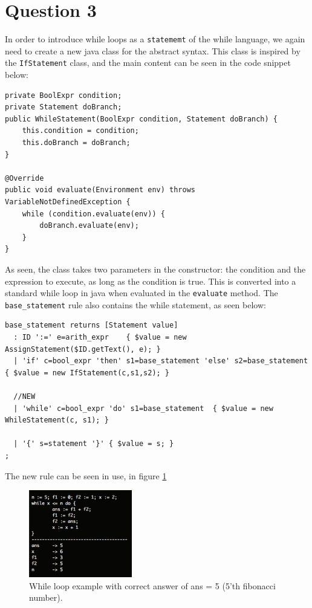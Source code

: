 \section*{Question 3}
In order to introduce while loops as a \texttt{statememt} of the while language, we again need to create a new java class for the abstract syntax. This class is inspired by the \texttt{IfStatement} class, and the main content can be seen in the code snippet below:

\begin{lstlisting}
private BoolExpr condition;
private Statement doBranch;
public WhileStatement(BoolExpr condition, Statement doBranch) {
	this.condition = condition;
	this.doBranch = doBranch;
}

@Override
public void evaluate(Environment env) throws VariableNotDefinedException {
	while (condition.evaluate(env)) {
		doBranch.evaluate(env);	
	} 
}
\end{lstlisting}

As seen, the class takes two parameters in the constructor: the condition and the expression to execute, as long as the condition is true. This is converted into a standard while loop in java when evaluated in the \texttt{evaluate} method. The \texttt{base\_statement} rule also contains the while statement, as seen below:

\begin{lstlisting}
base_statement returns [Statement value]
  : ID ':=' e=arith_expr    { $value = new AssignStatement($ID.getText(), e); }
  | 'if' c=bool_expr 'then' s1=base_statement 'else' s2=base_statement  { $value = new IfStatement(c,s1,s2); }

  //NEW
  | 'while' c=bool_expr 'do' s1=base_statement  { $value = new WhileStatement(c, s1); }

  | '{' s=statement '}' { $value = s; }
;
\end{lstlisting}

The new rule can be seen in use, in figure \ref{fig:Q3ex}

\begin{figure}[H]
    \centering
    \includegraphics[width=0.4\textwidth]{fig/Q3example}
    \caption{While loop example with correct answer of ans = 5 (5'th fibonacci number).}
    \label{fig:Q3ex}
\end{figure}